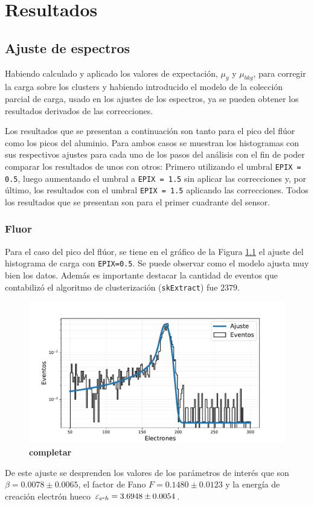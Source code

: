 \chapter{Resultados \label{chap:Resultados}}
\section{Ajuste de espectros}
\noindent Habiendo calculado y aplicado los valores de expectación, $\mu_{g}$ y $\mu_{bkg}$, para corregir la carga sobre los clusters y habiendo introducido el modelo de la colección parcial de carga, usado en los ajustes de los espectros, ya se pueden obtener los resultados derivados de las correcciones.

Los resultados que se presentan a continuación son tanto para el pico del flúor como los picos del aluminio. Para ambos casos se muestran los histogramas con sus respectivos ajustes para cada uno de los pasos del análisis con el fin de poder comparar los resultados de unos con otros: Primero utilizando el umbral \verb|EPIX = 0.5|, luego aumentando el umbral a \verb|EPIX = 1.5| sin aplicar las correcciones y, por último, los resultados con el umbral \verb|EPIX = 1.5| aplicando las correcciones. Todos los resultados que se presentan son para el primer cuadrante del sensor.

\subsection{Fluor}
\noindent Para el caso del pico del flúor, se tiene en el gráfico de la Figura \ref{fig:F_OHDU0_EPIX05} el ajuste del histograma de carga con \verb|EPIX=0.5|. Se puede observar como el modelo ajusta muy bien los datos. Además es importante destacar la cantidad de eventos que contabilizó el algoritmo de clusterización (\verb|skExtract|) fue $2379$. 
\begin{figure}[h]
    \centering
        \includegraphics[scale=0.5]{Figs/HistFit_F_EPIX05_OHDU1.pdf}
    \caption{\footnotesize{\textbf{completar}}}
    \label{fig:F_OHDU0_EPIX05}
\end{figure}
De este ajuste se desprenden los valores de los parámetros de interés que son $\beta = 0.0078 \pm 0.0065$, el factor de Fano $F = 0.1480 \pm 0.0123$ y la energía de creación electrón hueco $\varepsilon_{e\mbox{-}h} = 3.6948 \pm 0.0054$.

